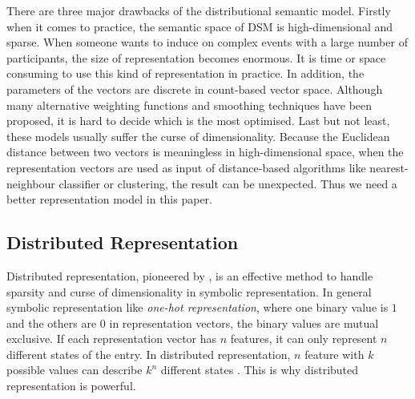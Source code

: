 \documentclass[a4paper]{article}
\begin{document}
There are three major drawbacks of the distributional semantic model. Firstly when it comes to practice, the semantic space of DSM is high-dimensional and sparse. When someone wants to induce on complex events with a large number of participants, the size of representation becomes enormous. It is time or space consuming to use this kind of representation in practice. In addition, the parameters of the vectors are discrete in count-based vector space. Although many alternative weighting functions and smoothing techniques have been proposed, it is hard to decide which is the most optimised. Last but not least, these models usually suffer the curse of dimensionality. Because the Euclidean distance between two vectors is meaningless in high-dimensional space, when the representation vectors are used as input of distance-based algorithms like nearest-neighbour classifier or clustering, the result can be unexpected. Thus we need a better representation model in this paper. 
% 
% 
% 
% 


\subsection{Distributed Representation} \label{sec:repr}
Distributed representation, pioneered by \citet{hinton1986learning}, is an effective method to handle sparsity and curse of dimensionality in symbolic representation. In general symbolic representation like \textit{one-hot representation}, where one binary value is $1$ and the others are $0$ in representation vectors, the binary values are mutual exclusive. If each representation vector has $n$ features, it can only represent $n$ different states of the entry. In distributed representation, $n$ feature with $k$ possible values can describe $k^n$ different states \citep{Goodfellow-et-al-2016}. This is why distributed representation is powerful. 
\end{document}

